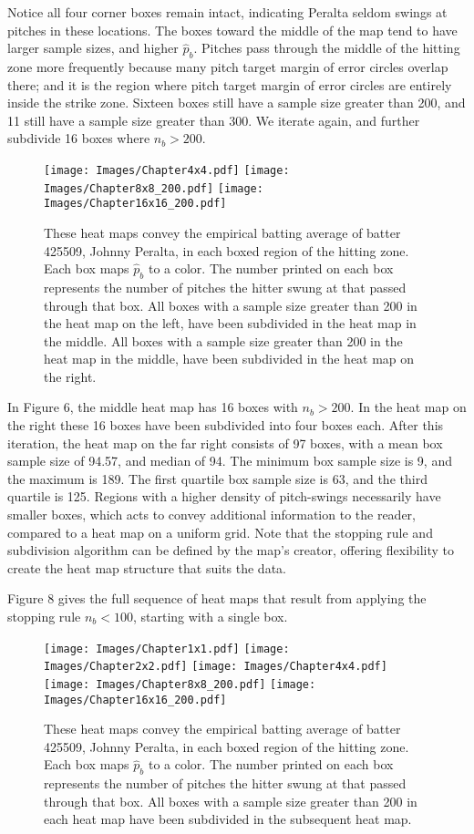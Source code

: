 Notice all four corner boxes remain intact, indicating Peralta seldom swings at pitches in these locations. The boxes toward the middle of the map tend to have larger sample sizes, and higher $\hat{p}_{b}$. Pitches pass through the middle of the hitting zone more frequently because many pitch target margin of error circles overlap there; and it is the region where pitch target margin of error circles are entirely inside the strike zone. Sixteen boxes still have a sample size greater than 200, and 11 still have a sample size greater than 300. We iterate again, and further subdivide 16 boxes where $n_{b} > 200$.
        \begin{figure}[H]
      	\centering
      	
      	\texttt{[image: Images/Chapter4x4.pdf]}
      	\texttt{[image: Images/Chapter8x8\_200.pdf]} 
      	\texttt{[image: Images/Chapter16x16\_200.pdf]} 
      	\caption{These heat maps convey the empirical batting average of batter 425509, Johnny Peralta, in each boxed region of the hitting zone. Each box maps $\hat{p}_{b}$ to a color. The number printed on each box represents the number of pitches the hitter swung at that passed through that box. All boxes with a sample size greater than 200 in the heat map on the left, have been subdivided in the heat map in the middle. All boxes with a sample size greater than 200 in the heat map in the middle, have been subdivided in the heat map on the right.}
      	\end{figure}
In Figure 6, the middle heat map has 16 boxes with $n_{b} > 200$. In the heat map on the right these 16 boxes have been subdivided into four boxes each. After this iteration, the heat map on the far right consists of 97 boxes, with a mean box sample size of 94.57, and median of 94. The minimum box sample size is 9, and the maximum is 189. The first quartile box sample size is 63, and the third quartile is 125. Regions with a higher density of pitch-swings necessarily have smaller boxes, which acts to convey additional information to the reader, compared to a heat map on a uniform grid. Note that the stopping rule and subdivision algorithm can be defined by the map's creator, offering flexibility to create the heat map structure that suits the data. 

Figure 8 gives the full sequence of heat maps that result from applying the stopping rule $n_{b} < 100$, starting with a single box.
        \begin{figure}[H]
      	\centering
      	\texttt{[image: Images/Chapter1x1.pdf]}
      	\texttt{[image: Images/Chapter2x2.pdf]}
      	\texttt{[image: Images/Chapter4x4.pdf]}
      	\texttt{[image: Images/Chapter8x8\_200.pdf]} 
      	\texttt{[image: Images/Chapter16x16\_200.pdf]} 
      	\caption{These heat maps convey the empirical batting average of batter 425509, Johnny Peralta, in each boxed region of the hitting zone. Each box maps $\hat{p}_{b}$ to a color. The number printed on each box represents the number of pitches the hitter swung at that passed through that box. All boxes with a sample size greater than 200 in each heat map have been subdivided in the subsequent heat map.}
      	\end{figure}

